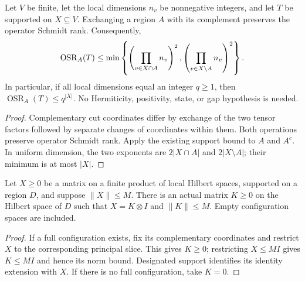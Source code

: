 \begin{theorem}
    \label{thm:supported_operator_schmidt_two_sides}
    \leanok
    Let $V$ be finite, let the local dimensions $n_v$ be nonnegative
    integers, and let $T$ be supported on $X\subseteq V$. Exchanging
    a region $A$ with its complement preserves the operator Schmidt
    rank. Consequently,
    \begin{align}
        \operatorname{OSR}_A(T)\leq
        \min\left\{\left(\prod_{v\in X\cap A}n_v\right)^2,
                    \left(\prod_{v\in X\setminus A}n_v\right)^2\right\}.\notag
    \end{align}
    In particular, if all local dimensions equal an integer $q\geq1$,
    then $\operatorname{OSR}_A(T)\leq q^{|X|}$. No Hermiticity,
    positivity, state, or gap hypothesis is needed.
\end{theorem}
\begin{proof}\leanok
    Complementary cut coordinates differ by exchange of the two
    tensor factors followed by separate changes of coordinates
    within them. Both operations preserve operator Schmidt rank.
    Apply the existing support bound to $A$ and $A^c$. In uniform
    dimension, the two exponents are $2|X\cap A|$ and
    $2|X\setminus A|$; their minimum is at most $|X|$.
\end{proof}

\begin{lemma}
    \label{lem:positive_regional_matrix_norm_cap}
    \leanok
    Let $X\ge0$ be a matrix on a finite product of local Hilbert spaces,
    supported on a region $D$, and suppose $\|X\|\le M$.
    There is an actual matrix $K\ge0$ on the Hilbert space of $D$ such
    that $X=K\otimes I$ and $\|K\|\le M$. Empty configuration spaces
    are included.
\end{lemma}
\begin{proof}\leanok
    If a full configuration exists, fix its complementary coordinates
    and restrict $X$ to the corresponding principal slice. This gives
    $K\ge0$; restricting $X\le MI$ gives $K\le MI$ and hence its norm
    bound. Designated support identifies its identity extension with
    $X$. If there is no full configuration, take $K=0$.
\end{proof}
